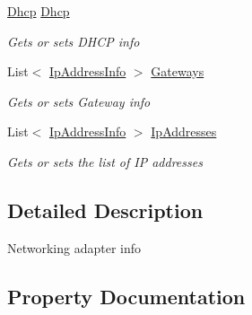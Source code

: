 \begin{DoxyCompactItemize}
\hyperlink{class_microsoft_1_1_tools_1_1_windows_device_portal_1_1_device_portal_1_1_dhcp}{Dhcp} \hyperlink{class_microsoft_1_1_tools_1_1_windows_device_portal_1_1_device_portal_1_1_network_adapter_info_a2881a656987d66a6f51724a086353b22}{Dhcp}
\begin{DoxyCompactList}\small\item\em Gets or sets D\+H\+CP info \end{DoxyCompactList}\item 
List$<$ \hyperlink{class_microsoft_1_1_tools_1_1_windows_device_portal_1_1_device_portal_1_1_ip_address_info}{Ip\+Address\+Info} $>$ \hyperlink{class_microsoft_1_1_tools_1_1_windows_device_portal_1_1_device_portal_1_1_network_adapter_info_a61d3c46974087197508db3e222d8c642}{Gateways}
\begin{DoxyCompactList}\small\item\em Gets or sets Gateway info \end{DoxyCompactList}\item 
List$<$ \hyperlink{class_microsoft_1_1_tools_1_1_windows_device_portal_1_1_device_portal_1_1_ip_address_info}{Ip\+Address\+Info} $>$ \hyperlink{class_microsoft_1_1_tools_1_1_windows_device_portal_1_1_device_portal_1_1_network_adapter_info_af1252d8fdc22be7336fbea9db464e884}{Ip\+Addresses}
\begin{DoxyCompactList}\small\item\em Gets or sets the list of IP addresses \end{DoxyCompactList}\end{DoxyCompactItemize}


\subsection{Detailed Description}
Networking adapter info 



\subsection{Property Documentation}
